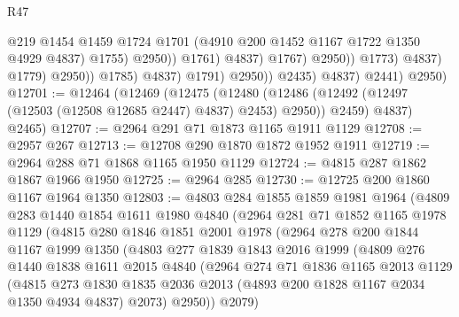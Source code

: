 \begin{lexlean}{R47}
\begin{coremodule}
                                                @219
                                                @1454
                                                @1459
                                                @1724
                                                @1701
                                                (@4910 @200 @1452 @1167 @1722 @1350 @4929 @4837)
                                                @1755)
                                              @2950))
                                          @1761)
                                        @4837)
                                      @1767)
                                    @2950))
                                @1773)
                              @4837)
                            @1779)
                          @2950))
                      @1785)
                    @4837)
                  @1791)
                @2950))
            @2435)
          @4837)
        @2441)
      @2950)
@12701 := @12464
    (@12469
      (@12475
        (@12480 (@12486 (@12492 (@12497 (@12503 (@12508 @12685 @2447) @4837) @2453) @2950)) @2459)
        @4837)
      @2465)
@12707 := @2964 @291 @71 @1873 @1165 @1911 @1129
@12708 := @2957 @267
@12713 := @12708 @290 @1870 @1872 @1952 @1911
@12719 := @2964 @288 @71 @1868 @1165 @1950 @1129
@12724 := @4815 @287 @1862 @1867 @1966 @1950
@12725 := @2964 @285
@12730 := @12725 @200 @1860 @1167 @1964 @1350
@12803 := @4803
    @284
    @1855
    @1859
    @1981
    @1964
    (@4809
      @283
      @1440
      @1854
      @1611
      @1980
      @4840
      (@2964
        @281
        @71
        @1852
        @1165
        @1978
        @1129
        (@4815
          @280
          @1846
          @1851
          @2001
          @1978
          (@2964
            @278
            @200
            @1844
            @1167
            @1999
            @1350
            (@4803
              @277
              @1839
              @1843
              @2016
              @1999
              (@4809
                @276
                @1440
                @1838
                @1611
                @2015
                @4840
                (@2964
                  @274
                  @71
                  @1836
                  @1165
                  @2013
                  @1129
                  (@4815
                    @273
                    @1830
                    @1835
                    @2036
                    @2013
                    (@4893 @200 @1828 @1167 @2034 @1350 @4934 @4837)
                    @2073)
                  @2950))
              @2079)

\end{coremodule}
\end{lexlean}
